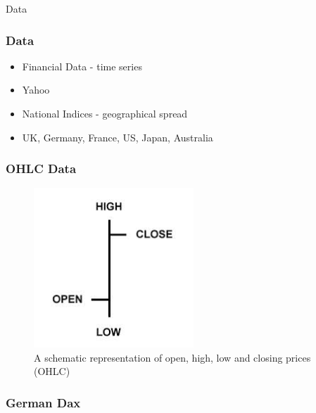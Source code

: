 \documentclass{beamer}
\begin{document}
\begin{frame}
\Huge{\centerline{Data}}
\end{frame}

\begin{frame}
\frametitle{Data}
\begin{itemize}
\item Financial Data - time series
\item Yahoo
\item National Indices - geographical spread
\item UK, Germany, France, US, Japan, Australia
\end{itemize}
\end{frame}

\begin{frame}
\frametitle{OHLC Data}
\begin{figure}
\centering
\includegraphics[width=6cm]{../Figures/chp3_ohlc}
\caption[]{A schematic representation of open, high, low and closing prices (OHLC)}
\label{fig:chp3_ohlc}
\end{figure}
\end{frame}

\begin{frame}
\frametitle{German Dax}

\end{frame}

\end{document}
